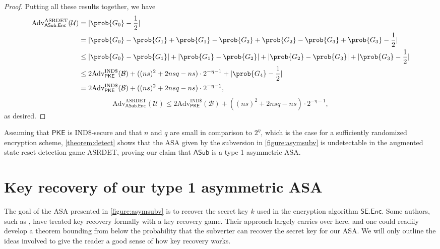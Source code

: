 \begin{proof}
Putting all these results together, we have
\iffullversion
\begin{align*}
\text{Adv}^\text{ASRDET}_\mathsf{ASub.Enc}(\mathcal{U})
&= |\prob{G_0}-\frac{1}{2}| \\
&= |\prob{G_0}-\prob{G_1}+\prob{G_1}-\prob{G_2}+\prob{G_2}-\prob{G_3}+\prob{G_3}-\frac{1}{2}| \\
&\le |\prob{G_0}-\prob{G_1}|+|\prob{G_1}-\prob{G_2}|+|\prob{G_2}-\prob{G_3}|+|\prob{G_3}-\frac{1}{2}| \\
&\le 2\text{Adv}^{\text{IND\$}}_\mathsf{PKE}(\mathcal{B}) + ((ns)^2+2nsq-ns)\cdot 2^{-\eta-1} + |\prob{G_4}-\frac{1}{2}|\\
&= 2\text{Adv}^{\text{IND\$}}_\mathsf{PKE}(\mathcal{B}) + ((ns)^2+2nsq-ns)\cdot 2^{-\eta-1},
\end{align*}
\else
\[
\text{Adv}^\text{ASRDET}_\mathsf{ASub.Enc}(\mathcal{U})\le 2\text{Adv}^{\text{IND\$}}_\mathsf{PKE}(\mathcal{B}) + ((ns)^2+2nsq-ns)\cdot 2^{-\eta-1},
\]
\fi
as desired.
\end{proof}

Assuming that $\mathsf{PKE}$ is IND\$-secure and that $n$ and $q$ are small in comparison to $2^{\eta}$, which is the case for a sufficiently randomized encryption scheme, \autoref{theorem:detect} shows that the ASA given by the subversion in \autoref{figure:asymsubv} is undetectable in the augmented state reset detection game ASRDET, proving our claim that $\mathsf{ASub}$ is a type 1 asymmetric ASA.


\section{Key recovery of our type 1 asymmetric ASA} \label{sec:keyrec1}
The goal of the ASA presented in \autoref{figure:asymsubv} is to recover the secret key $k$ used in the encryption algorithm $\mathsf{SE.Enc}$. Some authors, such as \cite{CCS:BelJaeKan15}, have treated key recovery formally with a key recovery game. Their approach largely carries over here, and one could readily develop a theorem bounding from below the probability that the subverter can recover the secret key for our ASA. We will only outline the ideas involved to give the reader a good sense of how key recovery works.

